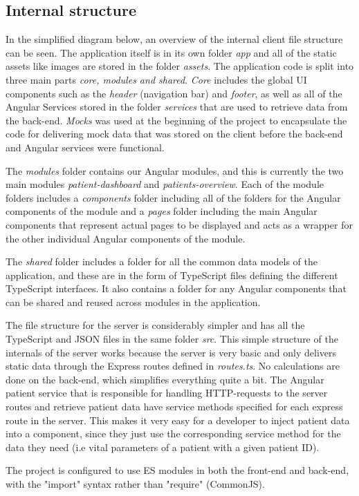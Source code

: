 \documentclass[10pt,a4paper]{article}
\begin{document}
\subsection{Internal structure}
In the simplified diagram below, an overview of the internal client file structure can be seen. The application itself is in its own folder \textit{app} and all of the static assets like images are stored in the folder \textit{assets}. The application code is split into three main parts \textit{core, modules and shared}. \textit{Core} includes the global UI components such as the \textit{header} (navigation bar) and \textit{footer}, as well as all of the Angular Services stored in the folder \textit{services} that are used to retrieve data from the back-end. \textit{Mocks} was used at the beginning of the project to encapsulate the code for delivering mock data that was stored on the client before the back-end and Angular services were functional. 

The \textit{modules} folder contains our Angular modules, and this is currently the two main modules \textit{patient-dashboard} and \textit{patients-overview}. Each of the module folders includes a \textit{components} folder including all of the folders for the Angular components of the module and a \textit{pages} folder including the main Angular components that represent actual pages to be displayed and acts as a wrapper for the other individual Angular components of the module.

The \textit{shared} folder includes a folder for all the common data models of the application, and these are in the form of TypeScript files defining the different TypeScript interfaces. It also contains a folder for any Angular components that can be shared and reused across modules in the application.

The file structure for the server is considerably simpler and has all the TypeScript and JSON files in the same folder \textit{src}. This simple structure of the internals of the server works because the server is very basic and only delivers static data through the Express routes defined in \textit{routes.ts}. No calculations are done on the back-end, which simplifies everything quite a bit. The Angular patient service that is responsible for handling HTTP-requests to the server routes and retrieve patient data have service methods specified for each express route in the server. This makes it very easy for a developer to inject patient data into a component, since they just use the corresponding service method for the data they need (i.e vital parameters of a patient with a given patient ID). 

The project is configured to use ES modules in both the front-end and back-end, with the "import" syntax rather than "require" (CommonJS). 


\end{document}

